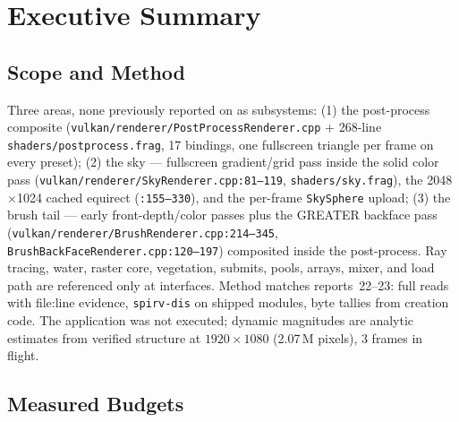 \documentclass[11pt,a4paper]{article}
\begin{document}
\tableofcontents
\newpage

\section{Executive Summary}

\subsection{Scope and Method}

Three areas, none previously reported on as subsystems: (1) the post-process
composite (\texttt{vulkan/renderer/PostProcessRenderer.cpp} + 268-line
\texttt{shaders/postprocess.frag}, 17 bindings, one fullscreen triangle per
frame on every preset); (2) the sky --- fullscreen gradient/grid pass inside
the solid color pass (\texttt{vulkan/renderer/SkyRenderer.cpp:81--119},
\texttt{shaders/sky.frag}), the 2048$\times$1024 cached equirect
(\texttt{:155--330}), and the per-frame \texttt{SkySphere} upload; (3) the
brush tail --- early front-depth/color passes plus the GREATER backface pass
(\texttt{vulkan/renderer/BrushRenderer.cpp:214--345},
\texttt{BrushBackFaceRenderer.cpp:120--197}) composited inside the
post-process. Ray tracing, water, raster core, vegetation, submits, pools,
arrays, mixer, and load path are referenced only at interfaces. Method
matches reports~22--23: full reads with file:line evidence,
\texttt{spirv-dis} on shipped modules, byte tallies from creation code. The
application was not executed; dynamic magnitudes are analytic estimates
from verified structure at $1920\times1080$ (2.07\,M pixels), 3 frames in
flight.

\subsection{Measured Budgets}
\end{document}
